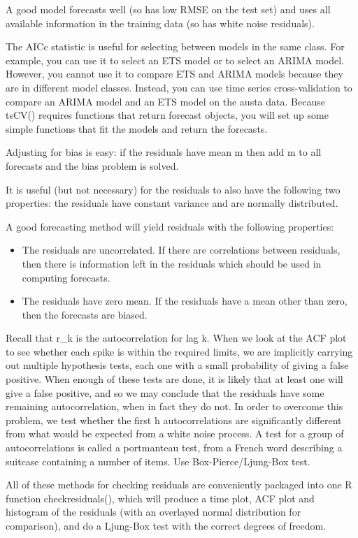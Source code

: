 \documentclass[]{book}
\begin{document}
A good model forecasts well (so has low RMSE on the test set) and uses all available information in the training data (so has white noise residuals).

The AICc statistic is useful for selecting between models in the same class. For example, you can use it to select an ETS model or to select an ARIMA model. However, you cannot use it to compare ETS and ARIMA models because they are in different model classes. Instead, you can use time series cross-validation to compare an ARIMA model and an ETS model on the austa data. Because tsCV() requires functions that return forecast objects, you will set up some simple functions that fit the models and return the forecasts.

Adjusting for bias is easy: if the residuals have mean m then add m to all forecasts and the bias problem is solved.

It is useful (but not necessary) for the residuals to also have the following two properties: the residuals have constant variance and are normally distributed.

A good forecasting method will yield residuals with the following properties:

\begin{itemize}
\item
  The residuals are uncorrelated. If there are correlations between residuals, then there is information left in the residuals which should be used in computing forecasts.
\item
  The residuals have zero mean. If the residuals have a mean other than zero, then the forecasts are biased.
\end{itemize}

Recall that r\_k is the autocorrelation for lag k. When we look at the ACF plot to see whether each spike is within the required limits, we are implicitly carrying out multiple hypothesis tests, each one with a small probability of giving a false positive. When enough of these tests are done, it is likely that at least one will give a false positive, and so we may conclude that the residuals have some remaining autocorrelation, when in fact they do not. In order to overcome this problem, we test whether the first h autocorrelations are significantly different from what would be expected from a white noise process. A test for a group of autocorrelations is called a portmanteau test, from a French word describing a suitcase containing a number of items. Use Box-Pierce/Ljung-Box test.

All of these methods for checking residuals are conveniently packaged into one R function checkresiduals(), which will produce a time plot, ACF plot and histogram of the residuals (with an overlayed normal distribution for comparison), and do a Ljung-Box test with the correct degrees of freedom.
\end{document}
